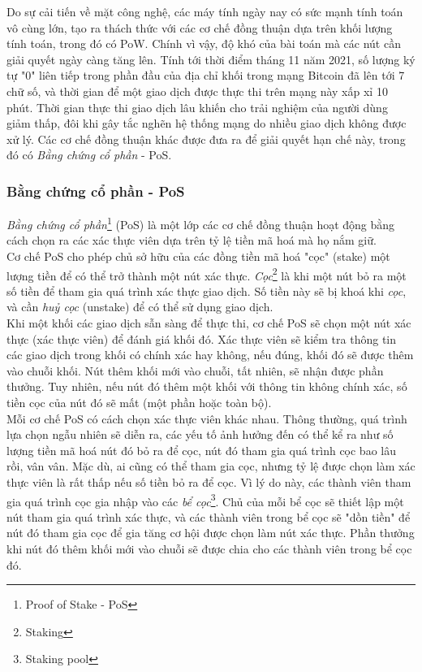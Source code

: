 Do sự cải tiến về mặt công nghệ, các máy tính ngày nay có sức mạnh tính toán vô cùng lớn, tạo ra thách thức với các cơ chế đồng thuận dựa trên khối lượng tính toán, trong đó có PoW. Chính vì vậy, độ khó của bài toán mà các nút cần giải quyết ngày càng tăng lên. Tính tới thời điểm tháng 11 năm 2021, số lượng ký tự "0" liên tiếp trong phần đầu của địa chỉ khối trong mạng Bitcoin đã lên tới 7 chữ số, và thời gian để một giao dịch được thực thi trên mạng này xấp xỉ 10 phút. Thời gian thực thi giao dịch lâu khiến cho trải nghiệm của người dùng giảm thấp, đôi khi gây tắc nghẽn hệ thống mạng do nhiều giao dịch không được xử lý. Các cơ chế đồng thuận khác được đưa ra để giải quyết hạn chế này, trong đó có \textit{Bằng chứng cổ phần} - PoS.

\subsubsection{Bằng chứng cổ phần - PoS}

\textit{Bằng chứng cổ phần}\footnote{Proof of Stake - PoS} (PoS) là một lớp các cơ chế đồng thuận hoạt động bằng cách chọn ra các xác thực viên dựa trên tỷ lệ tiền mã hoá mà họ nắm giữ.\\

Cơ chế PoS cho phép chủ sở hữu của các đồng tiền mã hoá "cọc" (stake) một lượng tiền để có thể trở thành một nút xác thực. \textit{Cọc}\footnote{Staking} là khi một nút bỏ ra một số tiền để tham gia quá trình xác thực giao dịch. Số tiền này sẽ bị khoá khi \textit{cọc}, và cần \textit{huỷ cọc} (unstake) để có thể sử dụng giao dịch.\\

Khi một khối các giao dịch sẫn sàng để thực thi, cơ chế PoS sẽ chọn một nút xác thực (xác thực viên) để đánh giá khối đó. Xác thực viên sẽ kiểm tra thông tin các giao dịch trong khối có chính xác hay không, nếu đúng, khối đó sẽ được thêm vào chuỗi khối. Nút thêm khối mới vào chuỗi, tất nhiên, sẽ nhận được phần thưởng. Tuy nhiên, nếu nút đó thêm một khối với thông tin không chính xác, số tiền cọc của nút đó sẽ mất (một phần hoặc toàn bộ).\\

Mỗi cơ chế PoS có cách chọn xác thực viên khác nhau. Thông thường, quá trình lựa chọn ngẫu nhiên sẽ diễn ra, các yếu tố ảnh hưởng đến có thể kể ra như số lượng tiền mã hoá nút đó bỏ ra để cọc, nút đó tham gia quá trình cọc bao lâu rồi, vân vân. Mặc dù, ai cũng có thể tham gia cọc, nhưng tỷ lệ được chọn làm xác thực viên là rất thấp nếu số tiền bỏ ra để cọc. Vì lý do này, các thành viên tham gia quá trình cọc gia nhập vào các \textit{bể cọc}\footnote{Staking pool}. Chủ của mỗi bể cọc sẽ thiết lập một nút tham gia quá trình xác thực, và các thành viên trong bể cọc sẽ "dồn tiền" để nút đó tham gia cọc để gia tăng cơ hội được chọn làm nút xác thực. Phần thưởng khi nút đó thêm khối mới vào chuỗi sẽ được chia cho các thành viên trong bể cọc đó.

